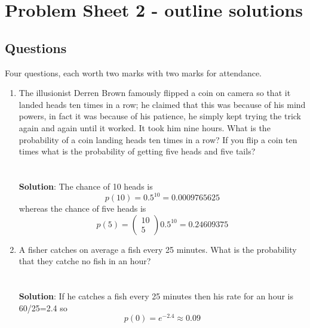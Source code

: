 \documentclass[11pt,a4paper]{scrartcl}
\begin{document}
\section*{Problem Sheet 2 - outline solutions}

\subsection*{Questions}

Four questions, each worth two marks with two marks for attendance.

\begin{enumerate}


\item The illusionist Derren Brown famously flipped a coin on camera
  so that it landed heads ten times in a row; he claimed that this was
  because of his mind powers, in fact it was because of his patience,
  he simply kept trying the trick again and again until it
  worked. It took him nine hours. What is the probability of a coin landing heads ten times in
  a row? If you flip a coin ten times what is the probability of
  getting five heads and five tails?\\ \\ \\ \textbf{Solution}: The chance of 10 heads is
\begin{equation}
p(10)=0.5^{10}=0.0009765625
\end{equation}
whereas the chance of five heads is
\begin{equation}
p(5)=\left(\begin{array}{c}10\\5\end{array}\right)0.5^{10}=0.24609375
\end{equation}


\item A fisher catches on average a fish every 25 minutes. What is the
  probability that they catche no fish in an
  hour?\\ \\ \\ \textbf{Solution}: If he catches a fish every 25
  minutes then his rate for an hour is 60/25=2.4 so
\begin{equation}
p(0)=e^{-2.4}\approx 0.09
\end{equation}


\end{enumerate}
\end{document}
